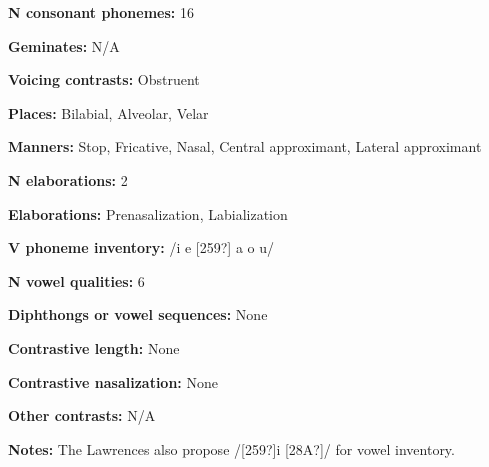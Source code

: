 \begin{styleBody}
\textbf{N consonant phonemes:} 16
\end{styleBody}

\begin{styleBody}
\textbf{Geminates:} N/A
\end{styleBody}

\begin{styleBody}
\textbf{Voicing contrasts:} Obstruent
\end{styleBody}

\begin{styleBody}
\textbf{Places:} Bilabial, Alveolar, Velar
\end{styleBody}

\begin{styleBody}
\textbf{Manners:} Stop, Fricative, Nasal, Central approximant, Lateral approximant
\end{styleBody}

\begin{styleBody}
\textbf{N elaborations:} 2
\end{styleBody}

\begin{styleBody}
\textbf{Elaborations:} Prenasalization, Labialization
\end{styleBody}

\begin{styleBody}
\textbf{V phoneme inventory:} /i e [259?] a o u/
\end{styleBody}

\begin{styleBody}
\textbf{N vowel qualities:} 6
\end{styleBody}

\begin{styleBody}
\textbf{Diphthongs or vowel sequences:} None
\end{styleBody}

\begin{styleBody}
\textbf{Contrastive length:} None
\end{styleBody}

\begin{styleBody}
\textbf{Contrastive nasalization:} None
\end{styleBody}

\begin{styleBody}
\textbf{Other contrasts:} N/A
\end{styleBody}

\begin{styleBody}
\textbf{Notes:} The Lawrences also propose /[259?]i [28A?]/ for vowel inventory.
\end{styleBody}

